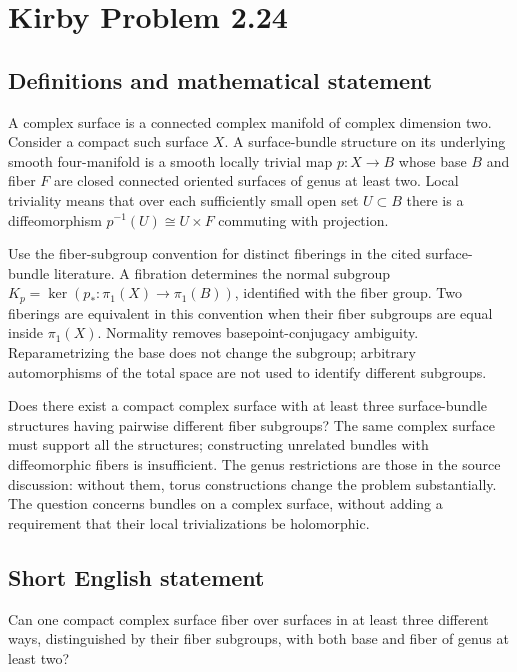 \documentclass[11pt,a4paper]{article}
\begin{document}
\section*{Kirby Problem 2.24}\label{statement}

\subsection{Definitions and mathematical statement}
A complex surface is a connected complex manifold of complex dimension two.
Consider a compact such surface $X$. A surface-bundle structure on its underlying
smooth four-manifold is a smooth locally trivial map $p:X\to B$ whose base $B$
and fiber $F$ are closed connected oriented surfaces of genus at least two.
Local triviality means that over each sufficiently small open set $U\subset B$
there is a diffeomorphism $p^{-1}(U)\cong U\times F$ commuting with projection.

Use the fiber-subgroup convention for distinct fiberings in the cited
surface-bundle literature. A fibration determines the normal subgroup
$K_p=\ker(p_*:\pi_1(X)\to\pi_1(B))$, identified with the fiber group.
Two fiberings are equivalent in this convention when their fiber subgroups
are equal inside $\pi_1(X)$. Normality removes basepoint-conjugacy ambiguity.
Reparametrizing the base does not change the subgroup; arbitrary
automorphisms of the total space are not used to identify different subgroups.

Does there exist a compact complex surface with at least three surface-bundle
structures having pairwise different fiber subgroups? The same complex surface
must support all the structures; constructing unrelated bundles with diffeomorphic
fibers is insufficient. The genus restrictions are those in the source discussion:
without them, torus constructions change the problem substantially. The question
concerns bundles on a complex surface, without adding a requirement that their
local trivializations be holomorphic.
\subsection{Short English statement}
Can one compact complex surface fiber over surfaces in at least three different ways, distinguished by their fiber subgroups, with both base and fiber of genus at least two?
\end{document}
